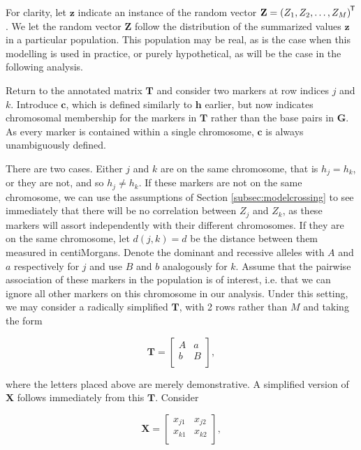 \documentclass{article}
\newcommand{\ve}[1]{\mathbf{#1}}           %
\newcommand{\m}[1]{\mathbf{#1}}               %
\newcommand{\tr}[1]{{#1}^{\mkern-1.5mu\mathsf{T}}}              %
\begin{document}
For clarity, let $\ve{z}$ indicate an instance of the random vector $\ve{Z} = \tr{(Z_1, Z_2, \dots, Z_M)}$. We let the random vector $\ve{Z}$ follow the distribution of the summarized values $\ve{z}$ in a particular population. This population may be real, as is the case when this modelling is used in practice, or purely hypothetical, as will be the case in the following analysis.

Return to the annotated matrix $\m{T}$ and consider two markers at row indices $j$ and $k$. Introduce $\ve{c}$, which is defined similarly to $\ve{h}$ earlier, but now indicates chromosomal membership for the markers in $\m{T}$ rather than the base pairs in $\m{G}$. As every marker is contained within a single chromosome, $\ve{c}$ is always unambiguously defined.

There are two cases. Either $j$ and $k$ are on the same chromosome, that is $h_j = h_k$, or they are not, and so $h_j \neq h_k$. If these markers are not on the same chromosome, we can use the assumptions of Section \ref{subsec:modelcrossing} to see immediately that there will be no correlation between $Z_j$ and $Z_k$, as these markers will assort independently with their different chromosomes. If they are on the same chromosome, let $d(j,k) = d$ be the distance between them measured in centiMorgans. Denote the dominant and recessive alleles with $A$ and $a$ respectively for $j$ and use $B$ and $b$ analogously for $k$. Assume that the pairwise association of these markers in the population is of interest, i.e. that we can ignore all other markers on this chromosome in our analysis. Under this setting, we may consider a radically simplified $\m{T}$, with 2 rows rather than $M$ and taking the form

$$\m{T} = \begin{bmatrix}
  A & a \\
  b & B \\
\end{bmatrix},$$

\noindent where the letters placed above are merely demonstrative. A simplified version of $\m{X}$ follows immediately from this $\m{T}$. Consider

$$\m{X} = \begin{bmatrix}
  x_{j1} & x_{j2} \\
  x_{k1} & x_{k2} \\
\end{bmatrix},$$
\end{document}
